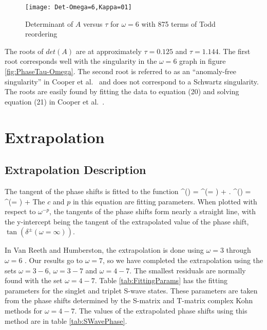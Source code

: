 \documentclass[Dissertation.tex]{subfiles}
\begin{document}
\begin{figure}[H]
	\centering
	\texttt{[image: Det-Omega=6,Kappa=01]}
	\caption{Determinant of $A$ versus $\tau$ for $\omega = 6$ with 875 terms of Todd reordering}
	\label{fig:Det-Omega=6,Kappa=01}
\end{figure}

The roots of $det(A)$ are at approximately $\tau = 0.125$ and $\tau = 1.144$. The first root corresponds well with the singularity in the $\omega = 6$ graph in figure \ref{fig:PhaseTau-Omega}. The second root is referred to as an ``anomaly-free singularity'' in Cooper et al.\ \cite{Cooper2009} and does not correspond to a Schwartz singularity. The roots are easily found by fitting the data to equation (20) and solving equation (21) in Cooper et al.\ \cite{Cooper2009}.


\section{Extrapolation}
\label{sec:Extrapolation}

\subsection{Extrapolation Description}

The tangent of the phase shifts is fitted to the function
\beq
\label{eq:PhaseExtrap}
\tan \delta^\pm(\omega) = \tan \delta^\pm(\omega = \infty) + .
\eeq
\beq
\label{eq:PhaseExtrap2}
\lambda^\pm(\omega) = \lambda^\pm(\omega = \infty) + 
\eeq
The $c$ and $p$ in this equation are fitting parameters. When plotted with respect to $\omega^{-p}$, the tangents of the phase shifts form nearly a straight line, with the y-intercept being the tangent of the extrapolated value of the phase shift, $\tan(\delta^\pm(\omega = \infty))$.

In Van Reeth and Humberston, the extrapolation is done using $\omega = 3$ through $\omega = 6$ \cite{VanReeth2003}. Our results go to $\omega = 7$, so we have completed the extrapolation using the sets $\omega = 3-6$, $\omega = 3-7$ and $\omega = 4-7$. The smallest residuals are normally found with the set $\omega = 4-7$. Table \ref{tab:FittingParams} has the fitting parameters for the singlet and triplet S-wave states. These parameters are taken from the phase shifts determined by the S-matrix and T-matrix complex Kohn methods for $\omega = 4-7$. The values of the extrapolated phase shifts using this method are in table \ref{tab:SWavePhase}.
\end{document}
